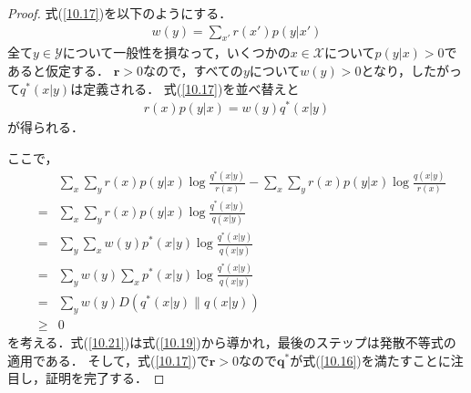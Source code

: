 \documentclass{ltjsarticle}
\theoremstyle{definition}
\begin{document}
\begin{proof}
  式(\ref{10.17})を以下のようにする．
  \begin{eqnarray}
    \label{10.18}
    w(y) = \sum_{x'}r(x')p(y|x')
  \end{eqnarray}
  全て$y \in \mathcal{Y}$について一般性を損なって，いくつかの$x \in \mathcal{X}$について$p(y|x) > 0$であると仮定する．
  $\mathbf{r} > 0$なので，すべての$y$について$w(y) > 0$となり，したがって$q^*(x|y)$は定義される．
  式(\ref{10.17})を並べ替えと
  \begin{eqnarray}
    \label{10.19}
    r(x)p(y|x) = w(y)q^*(x|y)
  \end{eqnarray}
  が得られる．

  ここで，
  \begin{eqnarray}
    && \sum_{x} \sum_{y} r(x)p(y|x) \log \frac{q^*(x|y)}{r(x)} - \sum_{x} \sum_{y} r(x)p(y|x) \log \frac{q(x|y)}{r(x)} \nonumber \\
    \label{10.20}
    &=& \sum_{x} \sum_{y} r(x) p(y|x)\log \frac{q^*(x|y)}{q(x|y)} \\
    \label{10.21}
    &=& \sum_{y} \sum_{x} w(y) p^*(x|y)\log \frac{q^*(x|y)}{q(x|y)} \\
    \label{10.22}
    &=& \sum_{y} w(y) \sum_{x}  p^*(x|y)\log \frac{q^*(x|y)}{q(x|y)} \\
    \label{10.23}
    &=& \sum_{y} w(y) D \left(  q^*(x|y) \parallel q(x|y) \right) \\
    \label{10.24}
    &\geq& 0
  \end{eqnarray}
  を考える．式(\ref{10.21})は式(\ref{10.19})から導かれ，最後のステップは発散不等式の適用である．
  そして，式(\ref{10.17})で$\mathbf{r}>0$なので$\mathbf{q}^*$が式(\ref{10.16})を満たすことに注目し，証明を完了する．
\end{proof}
\end{document}

